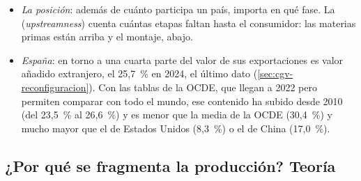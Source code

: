 \documentclass[11pt]{article}
\begin{document}
\begin{itemize}
  \begin{itemize}
  \item {}: el valor añadido extranjero contenido en las exportaciones del país, VAE (España exporta coches con piezas importadas);
  \item {}: el valor añadido del país contenido en las exportaciones de otros, VAI (España exporta piezas que van en los coches que exporta Francia);
  \item su suma, sobre las exportaciones brutas $X$, es el  en las cadenas\nocite{KoopmanWangWei2014}:
  \end{itemize}
\item \emph{La posición}: además de cuánto participa un país, importa en qué fase. La  (\emph{upstreamness}) cuenta cuántas etapas faltan hasta el consumidor: las materias primas están arriba y el montaje, abajo\nocite{Antras2012Upstreamness}.
\item \emph{España}: en torno a una cuarta parte del valor de sus exportaciones es valor añadido extranjero, el 25,7~\% en 2024, el último dato\nocite{Eurostat2026FIGAROcgv} (\ref{sec:cgv-reconfiguracion}). Con las tablas de la OCDE, que llegan a 2022 pero permiten comparar con todo el mundo, ese contenido ha subido desde 2010 (del 23,5~\% al 26,6~\%) y es menor que la media de la OCDE (30,4~\%) y mucho mayor que el de Estados Unidos (8,3~\%) o el de China (17,0~\%)\nocite{OCDE2025TiVA}.
\end{itemize}

\begin{infografia}[H]
\centering
\caption{Participación en las cadenas globales de valor: hacia atrás y hacia delante}\label{figu:cgv-participacion}
\end{infografia}

\subsection{¿Por qué se fragmenta la producción? Teoría}\label{sec:cgv-teoria}
\end{document}
